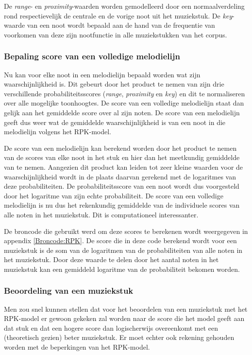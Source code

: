 De \textit{range}- en \textit{proximity}-waarden worden gemodelleerd door een normaalverdeling rond respectievelijk de centrale en de vorige noot uit het muziekstuk. De \textit{key}-waarde van een noot wordt bepaald aan de hand van de frequentie van voorkomen van deze zijn nootfunctie in alle muziekstukken van het corpus.

\subsubsection{Bepaling score van een volledige melodielijn}
Nu kan voor elke noot in een melodielijn bepaald worden wat zijn waarschijnlijkheid is. Dit gebeurt door het product te nemen van zijn drie verschillende probabiliteitsscores (\textit{range}, \textit{proximity} en \textit{key}) en dit te normaliseren over alle mogelijke toonhoogtes. De score van een volledige melodielijn staat dan gelijk aan het gemiddelde score over al zijn noten. De score van een melodielijn geeft dus weer wat de gemiddelde waarschijnlijkheid is van een noot in die melodielijn volgens het RPK-model. 

De score van een melodielijn kan berekend worden door het product te nemen van de scores van elke noot in het stuk en hier dan het meetkundig gemiddelde van te nemen. Aangezien dit product kan leiden tot zeer kleine waarden voor de waarschijnlijkheid wordt in de plaats daarvan gerekend met de logaritmes van deze probabiliteiten. De probabiliteitsscore van een noot wordt dus voorgesteld door het logaritme van zijn echte probabiliteit. De score van een volledige melodielijn is nu dus het rekenkundig gemiddelde van de individuele scores van alle noten in het muziekstuk. Dit is computationeel interessanter. 

De broncode die gebruikt werd om deze scores te berekenen wordt weergegeven in appendix \ref{Broncode:RPK}. De score die in deze code berekend wordt voor een muziekstuk is de som van de logaritmen van de probabiliteiten van alle noten in het muziekstuk. Door deze waarde te delen door het aantal noten in het muziekstuk kan een gemiddeld logaritme van de probabiliteit bekomen worden.

\subsubsection{Beoordeling van een muziekstuk}
Men zou snel kunnen stellen dat voor het beoordelen van een muziekstuk met het RPK-model er gewoon gekeken zal worden naar de score die het model geeft aan dat stuk en dat een hogere score dan logischerwijs overeenkomt met een (theoretisch gezien) beter muziekstuk. Er moet echter ook rekening gehouden worden met de beperkingen van het RPK-model. 

